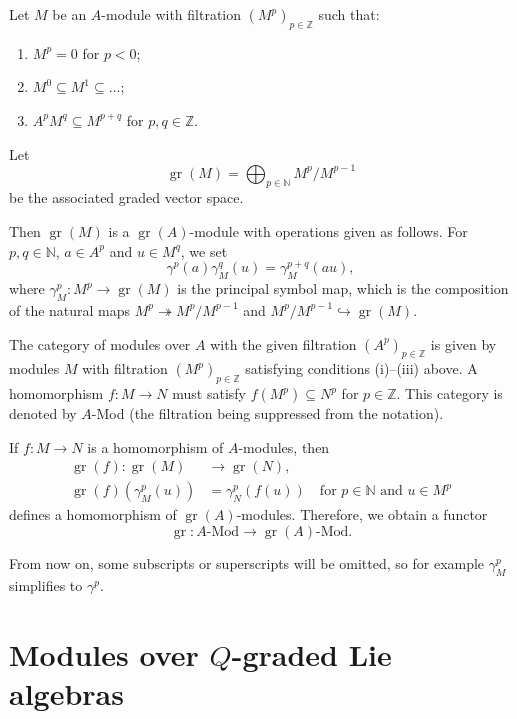\documentclass[a4paper, 12pt, reqno]{amsart}
\theoremstyle{remark}
\DeclareMathOperator{\gr}{gr}
\begin{document}
Let $M$ be an $A$-module with filtration $(M^p)_{p \in \mathbb{Z}}$ such that:
\begin{enumerate}
\item $M^p = 0$ for $p < 0$;
\item $M^0 \subseteq M^1 \subseteq \dots$;
\item $A^pM^q \subseteq M^{p + q}$ for $p, q \in \mathbb{Z}$.
\end{enumerate}
Let
\begin{equation*}
  \gr(M) = \bigoplus_{p \in \mathbb{N}}M^p/M^{p - 1}
\end{equation*}
be the associated graded vector space.

Then $\gr(M)$ is a $\gr(A)$-module with operations given as follows.
For $p, q \in \mathbb{N}$, $a \in A^p$ and $u \in M^q$, we set
\begin{equation*}
  \gamma^p(a)\gamma^q_M(u) = \gamma^{p + q}_M(au),
\end{equation*}
where $\gamma^p_M: M^p \to \gr(M)$ is the principal symbol map, which is the composition of the natural maps $M^p \twoheadrightarrow M^p/M^{p - 1}$ and $M^p/M^{p - 1} \hookrightarrow \gr(M)$.

The category of modules over $A$ with the given filtration $(A^p)_{p \in \mathbb{Z}}$ is given by modules $M$ with filtration $(M^p)_{p \in \mathbb{Z}}$ satisfying conditions (i)--(iii) above.
A homomorphism $f: M \to N$ must satisfy $f(M^p) \subseteq N^p$ for $p \in \mathbb{Z}$.
This category is denoted by $A$-Mod (the filtration being suppressed from the notation).

If $f: M \to N$ is a homomorphism of $A$-modules, then
\begin{align*}
  \gr(f): \gr(M) &\to \gr(N), \\
  \gr(f)(\gamma_M^p(u)) &= \gamma_N^p(f(u)) \quad \text{for $p \in \mathbb{N}$ and $u \in M^p$}
\end{align*}
defines a homomorphism of $\gr(A)$-modules.
Therefore, we obtain a functor
\begin{equation*}
  \gr: \text{$A$-Mod} \to \text{$\gr(A)$-Mod}.
\end{equation*}

From now on, some subscripts or superscripts will be omitted, so for example $\gamma^p_M$ simplifies to $\gamma^p$.

\section{Modules over $Q$-graded Lie algebras}
\label{sec:modules-over-q}
\end{document}
